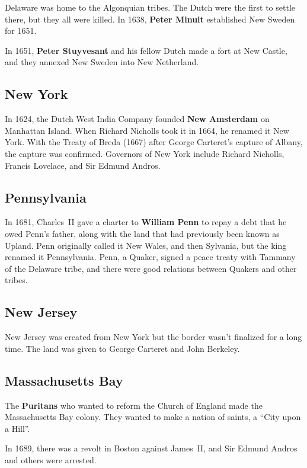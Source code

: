 Delaware was home to the Algonquian tribes.
The Dutch were the first to settle there, but they all were killed.
In 1638, \textbf{Peter Minuit} established New Sweden for 1651.

In 1651, \textbf{Peter Stuyvesant} and his fellow Dutch made a fort at New Castle,
and they annexed New Sweden into New Netherland.

\subsection*{New York}

In 1624, the Dutch West India Company founded \textbf{New Amsterdam} on Manhattan Island.
When Richard Nicholls took it in 1664, he renamed it New York.
With the Treaty of Breda (1667) after George Carteret's capture of Albany,
the capture was confirmed.
Governors of New York include Richard Nicholls, Francis Lovelace, and Sir Edmund Andros.

\subsection*{Pennsylvania}

In 1681, Charles~II gave a charter to \textbf{William Penn} to repay a debt that he owed Penn's father,
along with the land that had previously been known as Upland.
Penn originally called it New Wales, and then Sylvania, but the king renamed it Pennsylvania.
Penn, a Quaker, signed a peace treaty with Tammany of the Delaware tribe,
and there were good relations between Quakers and other tribes.

\subsection*{New Jersey}

New Jersey was created from New York but the border wasn't finalized for a long time.
The land was given to George Carteret and John Berkeley.

\subsection*{Massachusetts Bay}

The \textbf{Puritans} who wanted to reform the Church of England made the Massachusetts Bay colony.
They wanted to make a nation of saints, a ``City upon a Hill''.

In 1689, there was a revolt in Boston against James~II, and Sir Edmund Andros and others were arrested.

